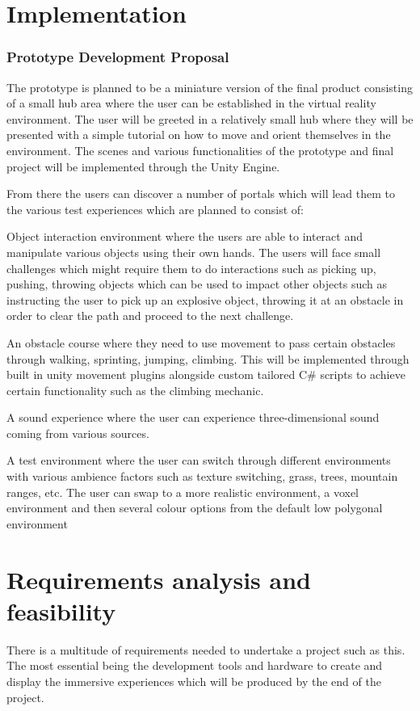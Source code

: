 \chapter{Implementation}

\subsection{Prototype Development Proposal}
The prototype is planned to be a miniature version of the final product consisting of a small hub area where the user can be established in the virtual reality environment. The user will be greeted in a relatively small hub where they will be presented with a simple tutorial on how to move and orient themselves in the environment. The scenes and various functionalities of the prototype and final project will be implemented through the Unity Engine. 

From there the users can discover a number of portals which will lead them to the various test experiences which are planned to consist of:  
 
Object interaction environment where the users are able to interact and manipulate various objects using their own hands. The users will face small challenges which might require them to do interactions such as picking up, pushing, throwing objects which can be used to impact other objects such as instructing the user to pick up an explosive object, throwing it at an obstacle in order to clear the path and proceed to the next challenge. 
 
An obstacle course where they need to use movement to pass certain obstacles through walking, sprinting, jumping, climbing. This will be implemented through built in unity movement plugins alongside custom tailored C# scripts to achieve certain functionality such as the climbing mechanic. 

A sound experience where the user can experience three-dimensional sound coming from various sources. 

A test environment where the user can switch through different environments with various ambience factors such as texture switching, grass, trees, mountain ranges, etc. The user can swap to a more realistic environment, a voxel environment and then several colour options from the default low polygonal environment 

\chapter{Requirements analysis and feasibility}
There is a multitude of requirements needed to undertake a project such as this. The most essential being the development tools and hardware to create and display the immersive experiences which will be produced by the end of the project.  
 

